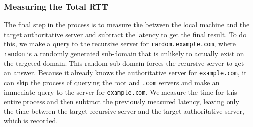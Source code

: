 \subsubsection{Measuring the Total RTT} 
The final step in the process is to measure the \rtt between the local machine and the target authoritative server and subtract the latency to get the final result. To do this, we make a query to the recursive server for \texttt{random.example.com}, where \texttt{random} is a randomly generated sub-domain that is unlikely to actually exist on the targeted domain. This random sub-domain forces the recursive server to get an answer. Because it already knows the authoritative server for \texttt{example.com}, it can skip the process of querying the root and \texttt{.com} servers and make an immediate query to the server for \texttt{example.com}. We measure the time for this entire process and then subtract the previously measured latency, leaving only the time between the target recursive server and the target authoritative server, which is recorded.